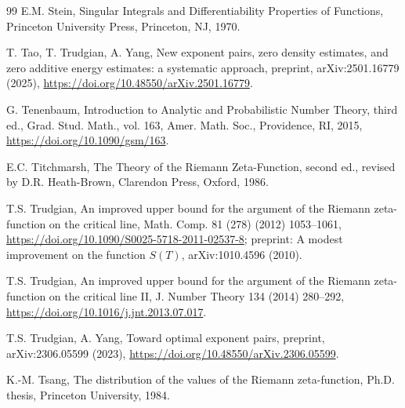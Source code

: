 \documentclass[preprint,12pt]{elsarticle}
\numberwithin{equation}{section}
\theoremstyle{plain}
\theoremstyle{definition}
\theoremstyle{remark}
\begin{document}
\begin{thebibliography}{99}
E.M. Stein, Singular Integrals and Differentiability Properties of Functions, Princeton University Press, Princeton, NJ, 1970.

T. Tao, T. Trudgian, A. Yang, New exponent pairs, zero density estimates, and zero additive energy estimates: a systematic approach, preprint, arXiv:2501.16779 (2025), \href{https://doi.org/10.48550/arXiv.2501.16779}{https://doi.org/10.48550/arXiv.2501.16779}.

G. Tenenbaum, Introduction to Analytic and Probabilistic Number Theory, third ed., Grad. Stud. Math., vol. 163, Amer. Math. Soc., Providence, RI, 2015, \href{https://doi.org/10.1090/gsm/163}{https://doi.org/10.1090/gsm/163}.

E.C. Titchmarsh, The Theory of the Riemann Zeta-Function, second ed., revised by D.R. Heath-Brown, Clarendon Press, Oxford, 1986.

T.S. Trudgian, An improved upper bound for the argument of the Riemann zeta-function on the critical line, Math. Comp. 81 (278) (2012) 1053--1061, \href{https://doi.org/10.1090/S0025-5718-2011-02537-8}{https://doi.org/10.1090/S0025-5718-2011-02537-8}; preprint: A modest improvement on the function $S(T)$, arXiv:1010.4596 (2010).

T.S. Trudgian, An improved upper bound for the argument of the Riemann zeta-function on the critical line II, J. Number Theory 134 (2014) 280--292, \href{https://doi.org/10.1016/j.jnt.2013.07.017}{https://doi.org/10.1016/j.jnt.2013.07.017}.

T.S. Trudgian, A. Yang, Toward optimal exponent pairs, preprint, arXiv:2306.05599 (2023), \href{https://doi.org/10.48550/arXiv.2306.05599}{https://doi.org/10.48550/arXiv.2306.05599}.

K.-M. Tsang, The distribution of the values of the Riemann zeta-function, Ph.D. thesis, Princeton University, 1984.

\end{thebibliography}
\end{document}
